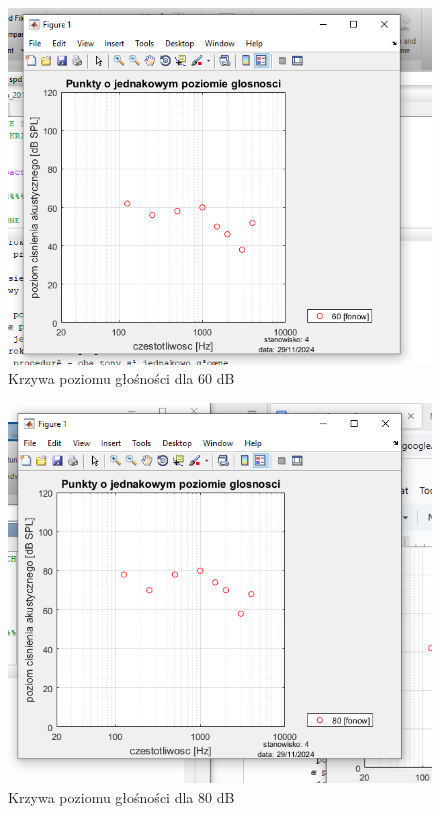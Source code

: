 \documentclass[12pt]{article}
\begin{document}
    \begin{figure}[H]
        \centering
        \includegraphics[width=\textwidth]{glosnosc_60.png}
        \caption{Krzywa poziomu głośności dla 60 dB}
    \end{figure}
    \begin{figure}[H]
        \centering
        \includegraphics[width=\textwidth]{glosnosc_80.png}
        \caption{Krzywa poziomu głośności dla 80 dB}
    \end{figure}
\end{document}
